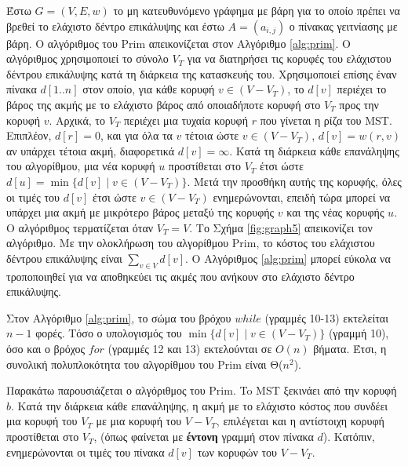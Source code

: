 \documentclass[12pt,a4paper]{article}
\begin{document}
Έστω $G = (V, E, w)$ το μη κατευθυνόμενο γράφημα με βάρη για το οποίο πρέπει να βρεθεί το ελάχιστο δέντρο επικάλυψης και έστω $A = (a_{i, j})$ ο πίνακας γειτνίασης με βάρη. O αλγόριθμος του \foreignlanguage{english}{Prim} απεικονίζεται στον Αλγόριθμο \ref{alg:prim}. Ο αλγόριθμος χρησιμοποιεί το σύνολο $V_T$ για να διατηρήσει τις κορυφές του ελάχιστου δέντρου επικάλυψης κατά τη διάρκεια της κατασκευής του. Χρησιμοποιεί επίσης έναν πίνακα $d[1..n]$ στον οποίο, για κάθε κορυφή $v \in (V - V_T)$, το $d[v]$ περιέχει το βάρος της ακμής με το ελάχιστο βάρος από οποιαδήποτε κορυφή στο $V_T$ προς την κορυφή $v$. Αρχικά, το $V_T$ περιέχει μια τυχαία κορυφή $r$ που γίνεται η ρίζα του \foreignlanguage{english}{MST}. Επιπλέον, $d[r] = 0$, και για όλα τα $v$ τέτοια ώστε $v \in (V - V_T)$, $d[v] = w(r, v)$ αν υπάρχει τέτοια ακμή, διαφορετικά $d[v] = \infty$. Κατά τη διάρκεια κάθε επανάληψης του αλγορίθμου, μια νέα κορυφή $u$ προστίθεται στο $V_T$ έτσι ώστε $d[u] = \min\{d[v] \mid v \in (V - V_T)\}$. Μετά την προσθήκη αυτής της κορυφής, όλες οι τιμές του $d[v]$ έτσι ώστε $v \in (V - V_T)$ ενημερώνονται, επειδή τώρα μπορεί να υπάρχει μια ακμή με μικρότερο βάρος μεταξύ της κορυφής $v$ και της νέας κορυφής $u$. Ο αλγόριθμος τερματίζεται όταν $V_T = V$. Το Σχήμα \ref{fig:graph5} απεικονίζει τον αλγόριθμο. Με την ολοκλήρωση του αλγορίθμου \foreignlanguage{english}{Prim}, το κόστος του ελάχιστου δέντρου επικάλυψης είναι $\sum_{v \in V} d[v]$. Ο Αλγόριθμος \ref{alg:prim} μπορεί εύκολα να τροποποιηθεί για να αποθηκεύει τις ακμές που ανήκουν στο ελάχιστο δέντρο επικάλυψης.

\vspace{0.3cm}



Στον Αλγόριθμο \ref{alg:prim}, το σώμα του βρόχου $while$ (γραμμές 10-13) εκτελείται $n-1$ φορές. Τόσο ο υπολογισμός του $\min \{ d[v] \mid v \in (V - V_T) \}$
(γραμμή 10), όσο και ο βρόχος $for$ (γραμμές 12 και 13) εκτελούνται σε $O(n)$ βήματα. Έτσι, η συνολική πολυπλοκότητα του αλγορίθμου του \foreignlanguage{english}{Prim} είναι Θ($n^2$). 

\vspace{0.3cm}
Παρακάτω παρουσιάζεται ο αλγόριθμος του \foreignlanguage{english}{Prim}. To \foreignlanguage{english}{MST} ξεκινάει από την κορυφή $b$. Κατά την διάρκεια κάθε επανάληψης, η ακμή με το ελάχιστο κόστος που συνδέει μια κορυφή του $V_T$ με μια κορυφή του $V - V_T$, επιλέγεται και η αντίστοιχη κορυφή προστίθεται στο $V_T$, (όπως φαίνεται με \textbf{έντονη} γραμμή στον πίνακα $d$). Κατόπιν, ενημερώνονται οι τιμές του πίνακα $d[v]$ των κορυφών του $V - V_T$.
\end{document}
